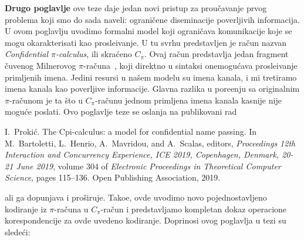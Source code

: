 {\bf Drugo poglavlje} ove teze daje jedan novi pristup za prou\v cavanje prvog problema koji smo do sada naveli: ograni\v cene diseminacije poverljivih informacija. U ovom poglavlju uvodimo formalni model koji ograni\v cava komunikacije koje se mogu okarakterisati kao prosle\dj ivanje. U tu svrhu predstavljen je ra\v cun nazvan \emph{Confidential $\pi$-calculus}, ili skra\' ceno $C_\pi$. Ovaj ra\v cun predstavlja jedan fragment \v cuvenog Milnerovog $\pi$-ra\v cuna~\cite{pi_calculus}, koji direktno u sintaksi onemogu\' cava prosle\dj ivanje primljenih imena. Jedini resursi u na\v sem modelu su imena kanala, i mi tretiramo imena kanala kao poverljive informacije. Glavna razlika u pore\dj enju sa originalnim $\pi$-ra\v cunom je ta \v sto u $C_\pi$-ra\v cunu jednom primljena imena kanala kasnije nije mogu\' ce poslati.
Ovo poglavlje teze se oslanja na publikovani rad
\begin{enumerate}
I.~Proki\'c.
\newblock The {C}pi-calculus: a model for confidential name passing.
\newblock In M.~Bartoletti, L.~Henrio, A.~Mavridou, and A.~Scalas, editors,
  {\em Proceedings 12th Interaction and Concurrency Experience, { ICE 2019}, {
  Copenhagen, Denmark, 20-21 June 2019}}, volume 304 of {\em Electronic
  Proceedings in Theoretical Computer Science}, pages 115--136. Open Publishing
  Association, 2019.
\end{enumerate}
ali ga dopunjava i pro\v siruje. Tako\dj e, ovde uvodimo novo pojednostavljeno kodiranje iz $\pi$-ra\v cuna u $C_\pi$-ra\v cun i predstavljamo kompletan dokaz operacione korespondencije za ovde uvedeno kodiranje.
Doprinosi ovog poglavlja u tezi su slede\' ci:
